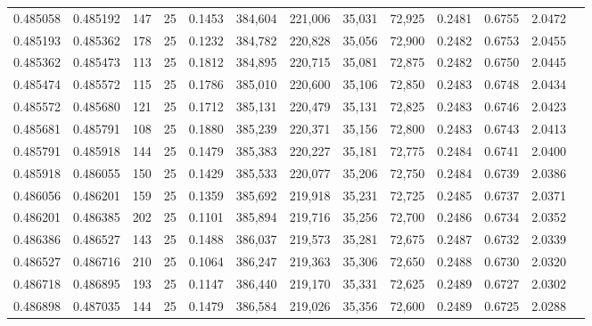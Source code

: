 \begin{tabular}{rrrrrrrrrrrrr}
0.485058 & 0.485192 &   147 &  25 &                                     0.1453 & 384,604 & 221,006 &  35,031 &  72,925 & 0.2481 & 0.6755 & 2.0472 \\
0.485193 & 0.485362 &   178 &  25 &                                     0.1232 & 384,782 & 220,828 &  35,056 &  72,900 & 0.2482 & 0.6753 & 2.0455 \\
0.485362 & 0.485473 &   113 &  25 &                                     0.1812 & 384,895 & 220,715 &  35,081 &  72,875 & 0.2482 & 0.6750 & 2.0445 \\
0.485474 & 0.485572 &   115 &  25 &                                     0.1786 & 385,010 & 220,600 &  35,106 &  72,850 & 0.2483 & 0.6748 & 2.0434 \\
0.485572 & 0.485680 &   121 &  25 &                                     0.1712 & 385,131 & 220,479 &  35,131 &  72,825 & 0.2483 & 0.6746 & 2.0423 \\
0.485681 & 0.485791 &   108 &  25 &                                     0.1880 & 385,239 & 220,371 &  35,156 &  72,800 & 0.2483 & 0.6743 & 2.0413 \\
0.485791 & 0.485918 &   144 &  25 &                                     0.1479 & 385,383 & 220,227 &  35,181 &  72,775 & 0.2484 & 0.6741 & 2.0400 \\
0.485918 & 0.486055 &   150 &  25 &                                     0.1429 & 385,533 & 220,077 &  35,206 &  72,750 & 0.2484 & 0.6739 & 2.0386 \\
0.486056 & 0.486201 &   159 &  25 &                                     0.1359 & 385,692 & 219,918 &  35,231 &  72,725 & 0.2485 & 0.6737 & 2.0371 \\
0.486201 & 0.486385 &   202 &  25 &                                     0.1101 & 385,894 & 219,716 &  35,256 &  72,700 & 0.2486 & 0.6734 & 2.0352 \\
0.486386 & 0.486527 &   143 &  25 &                                     0.1488 & 386,037 & 219,573 &  35,281 &  72,675 & 0.2487 & 0.6732 & 2.0339 \\
0.486527 & 0.486716 &   210 &  25 &                                     0.1064 & 386,247 & 219,363 &  35,306 &  72,650 & 0.2488 & 0.6730 & 2.0320 \\
0.486718 & 0.486895 &   193 &  25 &                                     0.1147 & 386,440 & 219,170 &  35,331 &  72,625 & 0.2489 & 0.6727 & 2.0302 \\
0.486898 & 0.487035 &   144 &  25 &                                     0.1479 & 386,584 & 219,026 &  35,356 &  72,600 & 0.2489 & 0.6725 & 2.0288 \\

\end{tabular}
